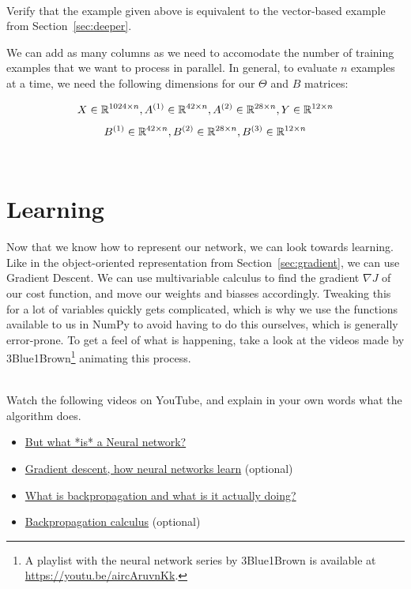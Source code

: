   \begin{exercise}\mbox{}\\
    Verify that the example given above is equivalent to the vector-based example from Section~\ref{sec:deeper}.
  \end{exercise}

We can add as many columns as we need to accomodate the number of training examples that we want to process in parallel. In general, to evaluate $n$ examples at a time, we need the following dimensions for our $\Theta$ and $B$ matrices:

  $$X \in \mathbb{R}^{1024\times n}, A^{(1)} \in \mathbb{R}^{42\times n}, A^{(2)} \in \mathbb{R}^{28\times n}, Y \in \mathbb{R}^{12\times n}$$
  $$B^{(1)} \in \mathbb{R}^{42 \times n}, B^{(2)} \in \mathbb{R}^{28 \times n}, B^{(3)} \in \mathbb{R}^{12 \times n}$$\\[-2mm]

\section{Learning}
Now that we know how to represent our network, we can look towards learning. Like in the object-oriented representation from Section~\ref{sec:gradient}, we can use Gradient Descent. We can use multivariable calculus to find the gradient $\nabla J$ of our cost function, and move our weights and biasses accordingly. Tweaking this for a lot of variables quickly gets complicated, which is why we use the functions available to us in NumPy to avoid having to do this ourselves, which is generally error-prone. To get a feel of what is happening, take a look at the videos made by 3Blue1Brown\footnote{A playlist with the neural network series by 3Blue1Brown is available at \url{https://youtu.be/aircAruvnKk}.} animating this process.

\begin{exercise}\mbox{}\\
  Watch the following videos on YouTube, and explain in your own words what the algorithm does.
  \begin{itemize}
    \item \href{https://www.youtube.com/watch?v=aircAruvnKk}{But what *is* a Neural network?}
    \item \href{https://www.youtube.com/watch?v=IHZwWFHWa-w}{Gradient descent, how neural networks learn} (optional)
    \item \href{https://www.youtube.com/watch?v=Ilg3gGewQ5U}{What is backpropagation and what is it actually doing?}
    \item \href{https://www.youtube.com/watch?v=tIeHLnjs5U8}{Backpropagation calculus} (optional)
  \end{itemize}
\end{exercise}

